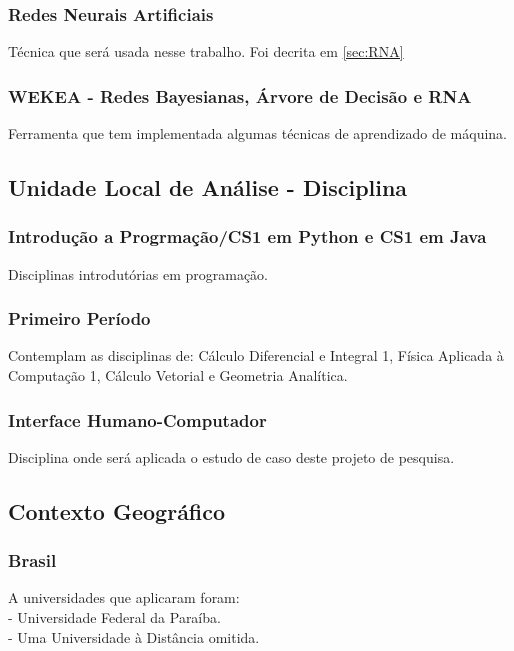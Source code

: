 \documentclass[
	12pt,				%
	openright,			%
	oneside,
	a4paper,			%
	english,			%
	french,				%
	spanish,			%
	brazil,				%
	]{abntex2}
\begin{document}
\subsubsection{Redes Neurais Artificiais}
\label{sec:RNA2}
Técnica que será usada nesse trabalho. Foi decrita em \ref{sec:RNA}

\subsubsection{WEKEA - Redes Bayesianas, Árvore de Decisão e RNA}
\label{sec:WEKA}
Ferramenta que tem implementada algumas técnicas de aprendizado de máquina.

\subsection{Unidade Local de Análise - Disciplina}
\label{sec:disc}

\subsubsection{Introdução a Progrmação/CS1 em Python e CS1 em Java}
\label{sec:icc}
Disciplinas introdutórias em programação.

\subsubsection{Primeiro Período}
\label{sec:1p}
Contemplam as disciplinas de: Cálculo Diferencial e Integral 1, Física Aplicada à Computação 1, Cálculo Vetorial e Geometria Analítica.

\subsubsection{Interface Humano-Computador}
\label{sec:IHC}
Disciplina onde será aplicada o estudo de caso deste projeto de pesquisa.

\subsection{Contexto Geográfico}
\label{sec:geo}

\subsubsection{Brasil}
\label{sec:BR}
A universidades que aplicaram foram:
\\
- Universidade Federal da Paraíba. \\
- Uma Universidade à Distância omitida. \\
\end{document}
